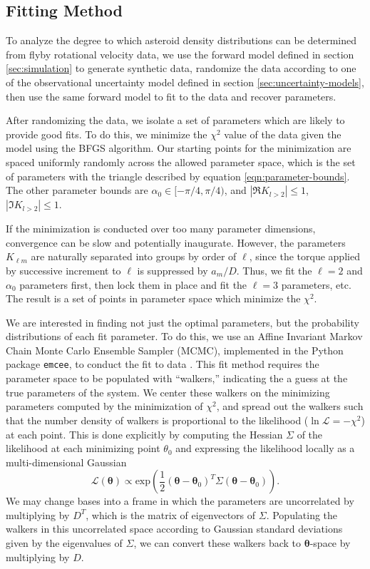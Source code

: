\documentclass[11pt]{article}
\newcommand{\parens}[1]{\left( #1 \right)}
\begin{document}
\subsection{Fitting Method}
To analyze the degree to which asteroid density distributions can be determined from flyby rotational velocity data, we use the forward model defined in section \ref{sec:simulation} to generate synthetic data, randomize the data according to one of the observational uncertainty model defined in section \ref{sec:uncertainty-models}, then use the same forward model to fit to the data and recover parameters.

After randomizing the data, we isolate a set of parameters which are likely to provide good fits. To do this, we minimize the $\chi^2$ value of the data given the model using the BFGS algorithm. Our starting points for the minimization are spaced uniformly randomly across the allowed parameter space, which is the set of parameters with the triangle described by equation \ref{eqn:parameter-bounds}. The other parameter bounds are $\alpha_0 \in [-\pi/4, \pi/4)$, and $|\Re K_{l>2}| \leq  1$, $|\Im K_{l>2}| \leq  1$.

If the minimization is conducted over too many parameter dimensions, convergence can be slow and potentially inaugurate. However, the parameters $K_{\ell m}$ are naturally separated into groups by order of $\ell$, since the torque applied by successive increment to $\ell$ is suppressed by $a_m/D$. Thus, we fit the $\ell=2$ and $\alpha_0$ parameters first, then lock them in place and fit the $\ell=3$ parameters, etc. The result is a set of points in parameter space which minimize the $\chi^2$.

We are interested in finding not just the optimal parameters, but the probability distributions of each fit parameter. To do this, we use an Affine Invariant Markov Chain Monte Carlo Ensemble Sampler (MCMC), implemented in the Python package \texttt{emcee}, to conduct the fit to data \cite{ForemanMackey2013emceeTM}. This fit method requires the parameter space to be populated with ``walkers,'' indicating the a guess at the true parameters of the system. We center these walkers on the minimizing parameters computed by the minimization of $\chi^2$, and spread out the walkers such that the number density of walkers is proportional to the likelihood ($\ln \mathcal{L} = -\chi^2$) at each point. This is done explicitly by computing the Hessian $\Sigma$ of the likelihood at each minimizing point $\theta_0$ and expressing the likelihood locally as a multi-dimensional Gaussian
\begin{equation}
\mathcal{L}(\bm \theta) \propto \text{exp}\parens{\frac{1}{2}(\bm \theta-\bm \theta_0)^T \Sigma (\bm \theta-\bm \theta_0)}.
\end{equation}
We may change bases into a frame in which the parameters are uncorrelated by multiplying by $D^T$, which is the matrix of eigenvectors of $\Sigma$. Populating the walkers in this uncorrelated space according to Gaussian standard deviations given by the eigenvalues of $\Sigma$, we can convert these walkers back to $\bm \theta$-space by multiplying by $D$.
\end{document}
